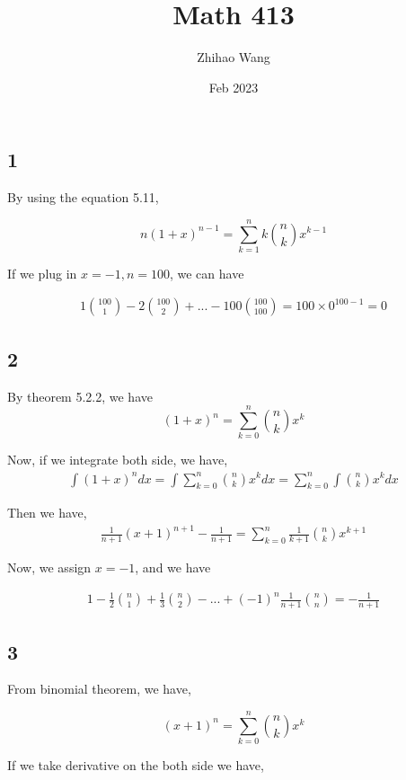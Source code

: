 \documentclass{article}
\title{Math 413}
\author{Zhihao Wang}
\date{Feb 2023}
\begin{document}
\maketitle

\subsection*{1}

By using the equation 5.11,

$$n(1+x)^{n-1} = \sum \limits_{k=1}^{n} k {n \choose k} x^{k-1}$$

If we plug in $x = -1, n = 100$, we can have

\[
\begin{split}
1{100 \choose 1} - 2{100 \choose 2} + ... - 100{100 \choose 100} = 100 \times 0^{100 - 1} = 0
\end{split}
\]

\subsection*{2}

By theorem 5.2.2, we have
$$(1+x)^{n} = \sum \limits_{k=0}^{n} {n \choose k} x^{k}$$

Now, if we integrate both side, we have,
\[
\begin{split}
\int (1+x)^{n} dx = \int \sum \limits_{k=0}^{n} {n \choose k} x^{k} dx =  \sum \limits_{k=0}^{n} \int {n \choose k} x^{k} dx
\end{split}
\]

Then we have,
\[
\begin{split}
\frac{1}{n+1} (x+1)^{n+1}  -\frac{1}{n+1} = \sum \limits_{k=0}^{n} \frac{1}{k+1} {n \choose k} x^{k+1} 
\end{split}
\]

Now, we assign $x = -1$, and we have

\[
\begin{split}
1 -\frac{1}{2}{n \choose 1} + \frac{1}{3}{n \choose 2} - ... + (-1)^n\frac{1}{n+1}{n \choose n} = - \frac{1}{n+1}
\end{split}
\]


\subsection*{3}
From binomial theorem, we have,

$$(x+1)^{n} = \sum \limits_{k=0}^{n} {n \choose k} x^k$$

If we take derivative on the both side we have,
\end{document}
